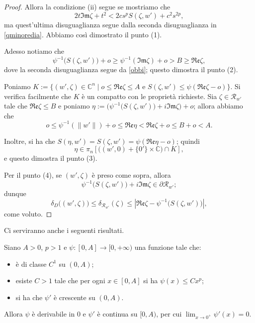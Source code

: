 \begin{proof}
    Allora la condizione (ii) segue se mostriamo che
    $$2t\mathfrak{Im}\zeta+t^2<2cs^pS(\zeta,w')+c^2s^{2p},$$
    ma quest'ultima disuguaglianza segue dalla seconda disuguaglianza in \eqref{qminoredia}. Abbiamo così dimostrato il punto (1).

    Adesso notiamo che
    $$\psi^{-1}\big(S(\zeta,w')\big)+o \ge \psi^{-1}(\mathfrak{Im}\zeta)+o>B\ge\mathfrak{Re}\zeta,$$
    dove la seconda disuguaglianza segue da \eqref{obbi}; questo dimostra il punto (2).

    Poniamo $K:=\{(w',\zeta)\in\mathbb{C}^n\mid o\le\mathfrak{Re}\zeta\le A\text{ e }S(\zeta,w')\le\psi(\mathfrak{Re}\zeta-o)\}$. Si verifica facilmente che $K$ è un compatto con le proprietà richieste. Sia $\zeta\in\mathcal{R}_{w'}$ tale che $\mathfrak{Re}\zeta\le B$ e poniamo $\eta:=\Big(\psi^{-1}\big(S(\zeta,w')\big)+i\mathfrak{Im}\zeta\Big)+o$; allora abbiamo che
    $$o\le\psi^{-1}(\|w'\|)+o\le\mathfrak{Re}\eta<\mathfrak{Re}\zeta+o\le B+o<A.$$

    Inoltre, si ha che $S(\eta,w')=S(\zeta,w')=\psi(\mathfrak{Re}\eta-o)$; quindi
    $$\eta\in\pi_n\left[\big((w',0)+\{0'\}\times\mathbb{C}\big)\cap K\right],$$
    e questo dimostra il punto (3).

    Per il punto (4), se $(w',\zeta)$ è preso come sopra, allora
    $$\psi^{-1}\big(S(\zeta,w')\big)+i\mathfrak{Im}\zeta\in\partial\mathcal{R}_{w'};$$
    dunque
    $$\delta_D\big((w',\zeta)\big)\le \delta_{\mathcal{R}_{w'}}(\zeta)\le\left|\mathfrak{Re}\zeta-\psi^{-1}\big(S(\zeta,w')\big)\right|,$$
    come voluto.
\end{proof}

Ci serviranno anche i seguenti risultati.

\begin{lm} \label{analisibase}
    Siano $A>0$, $p>1$ e $\psi:[0,A]\longrightarrow[0,+\infty)$ una funzione tale che:
    \begin{itemize}
        \item è di classe $C^1$ su $(0,A)$;
        \item esiste $C>1$ tale che per ogni $x\in[0,A]$ si ha $\psi(x) \le Cx^{p}$;
        \item si ha che $\psi'$ è crescente su $(0,A)$.
    \end{itemize}

    Allora $\psi$ è derivabile in $0$ e $\psi'$ è continua su $[0,A)$, per cui $\displaystyle\lim_{x\longrightarrow0^+}\psi'(x)=0$.
\end{lm}

